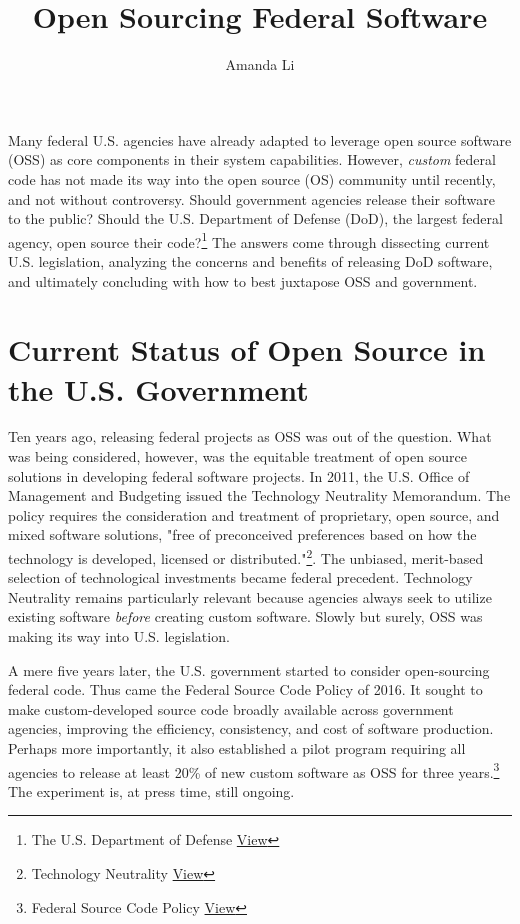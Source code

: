 \documentclass[a4paper]{article}
\title{Open Sourcing Federal Software}
\author{Amanda Li}
\begin{document}
\maketitle

\qquad Many federal U.S. agencies have already adapted to leverage open source software (OSS) as core components in their system capabilities. However, \textit{custom} federal code has not made its way into the open source (OS) community until recently, and not without controversy. Should government agencies release their software to the public? Should the U.S. Department of Defense (DoD), the largest federal agency, open source their code?\footnote{The U.S. Department of Defense \href{https://www.defense.gov/}{View}} The answers come through dissecting current U.S. legislation, analyzing the concerns and benefits of releasing DoD software, and ultimately concluding with how to best juxtapose OSS and government.

\section*{Current Status of Open Source in the U.S. Government}


\qquad Ten years ago, releasing federal projects as OSS was out of the question. What was being considered, however, was the equitable treatment of open source solutions in developing federal software projects. In 2011, the U.S. Office of Management and Budgeting issued the Technology Neutrality Memorandum. The policy requires the consideration and treatment of proprietary, open source, and mixed software solutions, "free of preconceived preferences based on how the technology is developed, licensed or distributed."\footnote{Technology Neutrality \href{https://obamawhitehouse.archives.gov/sites/default/files/omb/memoranda/2016/m_16_21.pdf}{View}}. The unbiased, merit-based selection of technological investments became federal precedent. Technology Neutrality remains particularly relevant because agencies always seek to utilize existing software \textit{before} creating custom software. Slowly but surely, OSS was making its way into U.S. legislation.

	A mere five years later, the U.S. government started to consider open-sourcing federal code. Thus came the Federal Source Code Policy of 2016. It sought to make custom-developed source code broadly available across government agencies, improving the efficiency, consistency, and cost of software production. Perhaps more importantly, it also established a pilot program requiring all agencies to release at least 20\% of new custom software as OSS for three years.\footnote{Federal Source Code Policy \href{sourcecode.cio.gov}{View}} The experiment is, at press time, still ongoing.
\end{document}
